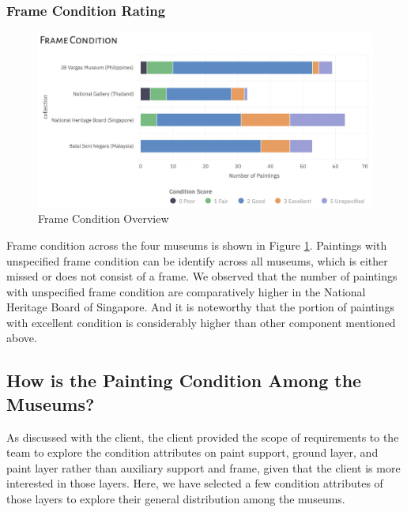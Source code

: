 \documentclass[11pt, oneside]{article}
\begin{document}
\subsubsection{Frame Condition Rating}
\begin{figure}[H]
    \centering
    \includegraphics[scale=0.5]{images/frame_cond.png}
    \caption{Frame Condition Overview}
    \label{frame_cond}
\end{figure}
Frame condition across the four museums is shown in Figure \ref{frame_cond}. Paintings with unspecified frame condition can be identify across all museums, which is either missed or does not consist of a frame. We observed that the number of paintings with unspecified frame condition are comparatively higher in the National Heritage Board of Singapore. And it is noteworthy that the portion of paintings with excellent condition is considerably higher than other component mentioned above.

\subsection{How is the Painting Condition Among the Museums?}
As discussed with the client, the client provided the scope of requirements to the team to explore the condition attributes on paint support, ground layer, and paint layer rather than auxiliary support and frame, given that the client is more interested in those layers. Here, we have selected a few condition attributes of those layers to explore their general distribution among the museums.
\end{document}

